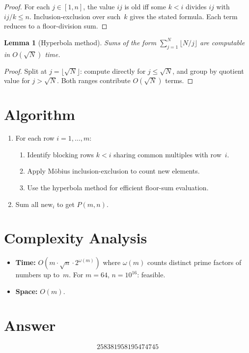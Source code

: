 \documentclass[11pt]{article}
\newtheorem{lemma}[theorem]{Lemma}
\begin{document}
\begin{proof}
For each $j \in [1, n]$, the value $ij$ is old iff some $k < i$ divides $ij$ with $ij/k \le n$. Inclusion-exclusion over such~$k$ gives the stated formula. Each term reduces to a floor-division sum.
\end{proof}

\begin{lemma}[Hyperbola method]
\label{lem:hyp}
Sums of the form $\sum_{j=1}^{N} \lfloor N/j \rfloor$ are computable in $O(\sqrt{N})$ time.
\end{lemma}

\begin{proof}
Split at $j = \lfloor \sqrt{N} \rfloor$: compute directly for $j \le \sqrt{N}$, and group by quotient value for $j > \sqrt{N}$. Both ranges contribute $O(\sqrt{N})$ terms.
\end{proof}

\section{Algorithm}

\begin{enumerate}
    \item For each row $i = 1, \ldots, m$:
    \begin{enumerate}
        \item Identify blocking rows $k < i$ sharing common multiples with row~$i$.
        \item Apply M\"obius inclusion-exclusion to count new elements.
        \item Use the hyperbola method for efficient floor-sum evaluation.
    \end{enumerate}
    \item Sum all $\mathrm{new}_i$ to get $P(m, n)$.
\end{enumerate}

\section{Complexity Analysis}

\begin{itemize}
    \item \textbf{Time:} $O(m \cdot \sqrt{n} \cdot 2^{\omega(m)})$ where $\omega(m)$ counts distinct prime factors of numbers up to~$m$. For $m = 64$, $n = 10^{16}$: feasible.
    \item \textbf{Space:} $O(m)$.
\end{itemize}

\section{Answer}

\[
\boxed{258381958195474745}
\]
\end{document}
